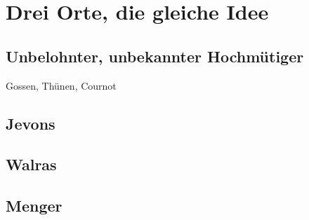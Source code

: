 %
%
%

\chapter{Drei Orte, die gleiche Idee}
\label{Marginalismus}

\section{Unbelohnter, unbekannter Hochmütiger}

Gossen, Thünen, Cournot

\section{Jevons}

\section{Walras}

\section{Menger}

